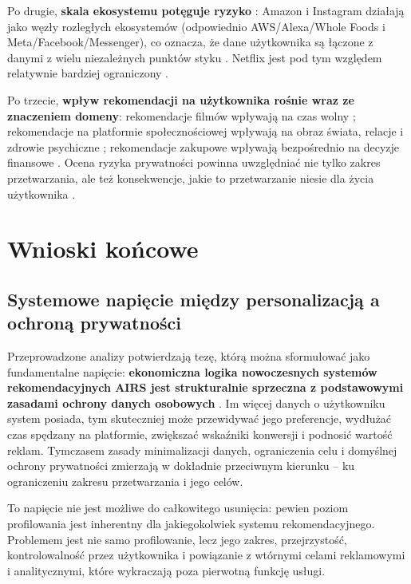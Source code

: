 \documentclass[12pt, a4paper]{article}
\begin{document}
Po drugie, \textbf{skala ekosystemu potęguje ryzyko} \cite{himeur2022}: Amazon i Instagram działają jako węzły rozległych ekosystemów (odpowiednio AWS/Alexa/Whole Foods i Meta/Facebook/Messenger), co oznacza, że dane użytkownika są łączone z danymi z wielu niezależnych punktów styku \cite{amazon_privacy, meta_privacy}. Netflix jest pod tym względem relatywnie bardziej ograniczony \cite{netflix_privacy}.

Po trzecie, \textbf{wpływ rekomendacji na użytkownika rośnie wraz ze znaczeniem domeny}: rekomendacje filmów wpływają na czas wolny \cite{netflix_recs}; rekomendacje na platformie społecznościowej wpływają na obraz świata, relacje i zdrowie psychiczne \cite{ig_ranking, reuters_nl}; rekomendacje zakupowe wpływają bezpośrednio na decyzje finansowe \cite{amazon_privacy}. Ocena ryzyka prywatności powinna uwzględniać nie tylko zakres przetwarzania, ale też konsekwencje, jakie to przetwarzanie niesie dla życia użytkownika \cite{chen2025}.

\newpage
\section{Wnioski końcowe}

\subsection{Systemowe napięcie między personalizacją a ochroną prywatności}

Przeprowadzone analizy potwierdzają tezę, którą można sformułować jako fundamentalne napięcie: \textbf{ekonomiczna logika nowoczesnych systemów rekomendacyjnych AIRS jest strukturalnie sprzeczna z podstawowymi zasadami ochrony danych osobowych} \cite{chen2025, himeur2022}. Im więcej danych o użytkowniku system posiada, tym skuteczniej może przewidywać jego preferencje, wydłużać czas spędzany na platformie, zwiększać wskaźniki konwersji i podnosić wartość reklam. Tymczasem zasady minimalizacji danych, ograniczenia celu i domyślnej ochrony prywatności \cite{rodo, edpb2019} zmierzają w dokładnie przeciwnym kierunku -- ku ograniczeniu zakresu przetwarzania i jego celów.

To napięcie nie jest możliwe do całkowitego usunięcia: pewien poziom profilowania jest inherentny dla jakiegokolwiek systemu rekomendacyjnego. Problemem jest nie samo profilowanie, lecz jego zakres, przejrzystość, kontrolowalność przez użytkownika i powiązanie z wtórnymi celami reklamowymi i analitycznymi, które wykraczają poza pierwotną funkcję usługi.
\end{document}
